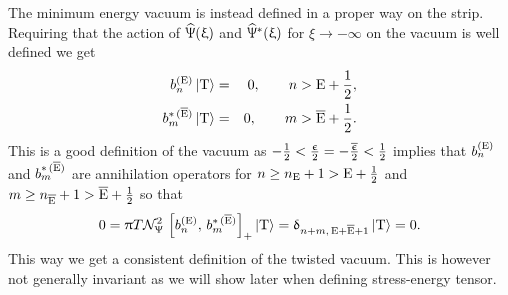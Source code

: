 The minimum energy vacuum is instead defined in a proper way on the strip.
Requiring that the action of $\widehat{\Uppsi}( \upxi )$ and $\widehat{\Uppsi}^*( \upxi )$ for $\xi \to -\infty$ on the vacuum is well defined we get
\begin{eqnarray}
  b^{(\mathrm{E})}_n \ket{\mathrm{T}}
  & = &
  0,
  \qquad
  n > \mathrm{E} + \frac{1}{2},
  \\
  b^{*\, ( \overline{\mathrm{E}} )}_m \ket{\mathrm{T}}
  & = &
  0,
  \qquad
  m > \overline{\mathrm{E}} + \frac{1}{2}.
\end{eqnarray}
This is a good definition of the vacuum as $-\frac{1}{2} < \frac{\upepsilon}{2} = -\frac{\overline{\upepsilon}}{2} < \frac{1}{2}$ implies that $b^{(\mathrm{E})}_n$ and $b^{*\, ( \overline{\mathrm{E}} )}_m$ are annihilation operators for $n \ge n_{\mathrm{E}}+1 > \mathrm{E} + \frac{1}{2}$ and $m \ge n_{\overline{\mathrm{E}}}+1 > \overline{\mathrm{E}} + \frac{1}{2}$ so that
\begin{equation}
  0
  =
  \uppi T \mathcal{N}_{\Uppsi}^2\,
  \left[ b^{(\mathrm{E})}_{n},\, b^{*\, ( \overline{\mathrm{E}} )}_{m} \right]_+
  \ket{\mathrm{T}}
  =
  \updelta_{n + m,\, \mathrm{E}+\overline{\mathrm{E}}+1 }
  \ket{\mathrm{T}}
  =
  0.
\end{equation}
This way we get a consistent definition of the twisted vacuum.
This is however not generally  invariant as we will show later when defining stress-energy tensor.\footnotemark{}

